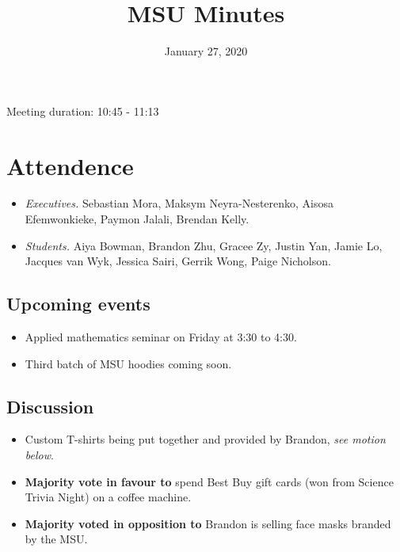 \documentclass[12pt]{article}
\title{MSU Minutes}
\date{January 27, 2020}
\begin{document}
\maketitle

Meeting duration: 10:45 - 11:13

\section*{Attendence}
\begin{itemize}
\item \textit{Executives.} Sebastian Mora, Maksym Neyra-Nesterenko, Aisosa Efemwonkieke, Paymon Jalali, Brendan Kelly.
\item \textit{Students.} Aiya Bowman, Brandon Zhu, Gracee Zy, Justin Yan, Jamie Lo, Jacques van Wyk, Jessica Sairi, Gerrik Wong, Paige Nicholson.
  
\end{itemize}

\subsection*{Upcoming events}
\begin{itemize}
\item Applied mathematics seminar on Friday at 3:30 to 4:30.
\item Third batch of MSU hoodies coming soon.
\end{itemize}

\subsection*{Discussion}
\begin{itemize}
\item Custom T-shirts being put together and provided by Brandon, \textit{see motion below}.
\item \textbf{Majority vote in favour to} spend Best Buy gift cards (won from Science Trivia Night) on a coffee machine.
\item \textbf{Majority voted in opposition to} Brandon is selling face masks branded by the MSU.
\end{itemize}
\end{document}
